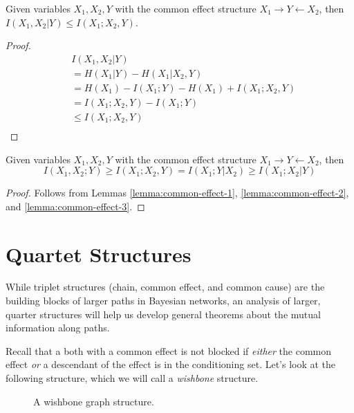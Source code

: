 \documentclass[../thesis.tex]{subfiles}
\begin{document}
\begin{lem}
  \label{lemma:common-effect-3}
  Given variables $X_1,X_2,Y$ with
  the common effect structure $X_1 \rightarrow Y \leftarrow X_2$,
  then $I(X_1,X_2 \vert Y) \leq I(X_1;X_2,Y)$.
\end{lem}
\begin{proof}
  \begin{equation}
    \begin{split}
      & I(X_1,X_2 \vert Y) \\
      & = H(X_1 \vert Y) - H(X_1 \vert X_2, Y) \\
      & = H(X_1) - I(X_1;Y) - H(X_1) + I(X_1;X_2,Y)\\
      & = I(X_1;X_2,Y) - I(X_1;Y) \\
      & \leq I(X_1;X_2,Y) \\
    \end{split}
  \end{equation}
\end{proof}

\begin{thm}
  \label{thm:common-effect-inequality}
  Given variables $X_1,X_2,Y$ with
  the common effect structure $X_1 \rightarrow Y \leftarrow X_2$, then
  $$I(X_1,X_2 ; Y) \geq I(X_1;X_2,Y) = I(X_1 ; Y \vert X_2) \geq I(X_1;X_2 \vert Y)$$
\end{thm}
\begin{proof}
  Follows from Lemmas \ref{lemma:common-effect-1},
  \ref{lemma:common-effect-2}, and \ref{lemma:common-effect-3}.
\end{proof}


\section{Quartet Structures}

While triplet structures (chain, common effect, and common cause)
are the building blocks of larger paths in Bayesian networks,
an analysis of larger, quarter structures will help us develop
general theorems about the mutual information along paths.

Recall that a both with a common effect is not blocked
if \emph{either} the common effect \emph{or} a descendant of
the effect is in the conditioning set.
Let's look at the following structure,
which we will call a \emph{wishbone} structure.

\begin{figure}
\begin{center}
\end{center}
\caption{A wishbone graph structure.}
\end{figure}
\end{document}
